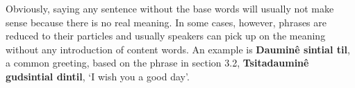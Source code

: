 \documentclass[12pt]{report}
\begin{document}
Obviously, saying any sentence without the base words will usually not make sense because there is no real meaning. In some cases, however, phrases are reduced to their particles and usually speakers can pick up on the meaning without any introduction of content words. An example is \textbf{Daumin\^e sintial til}, a common greeting, based on the phrase in section 3.2, \textbf{Tsitadaumin\^e gudsintial dintil}, `I wish you a good day'.
\end{document}
